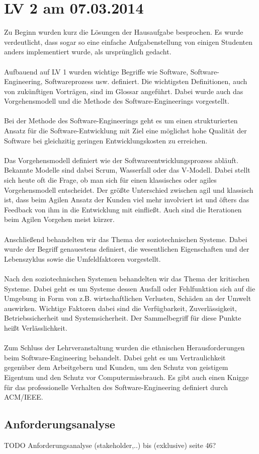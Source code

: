 \chapter{LV 2 am 07.03.2014}
Zu Beginn wurden kurz die Lösungen der Hausaufgabe besprochen. Es wurde verdeutlicht, dass sogar so eine einfache Aufgabenstellung von einigen Studenten anders implementiert wurde, als ursprünglich gedacht.
\\\\
Aufbauend auf LV 1 wurden wichtige Begriffe wie Software, Software-Engineering, Softwareprozess usw. definiert. Die wichtigsten Definitionen, auch von zukünftigen Vorträgen, sind im Glossar angeführt. Dabei wurde auch das Vorgehensmodell und die Methode des Software-Engineerings vorgestellt.
\\\\
Bei der Methode des Software-Engineerings geht es um einen strukturierten Ansatz für die Software-Entwicklung mit Ziel eine möglichst hohe Qualität der Software bei gleichzitig geringen Entwicklungskosten zu erreichen.
\\\\
Das Vorgehensmodell definiert wie der Softwareentwicklungsprozess abläuft. Bekannte Modelle sind dabei Scrum, Wasserfall oder das V-Modell. Dabei stellt sich heute oft die Frage, ob man sich für einen klassisches oder agiles Vorgehensmodell entscheidet. Der größte Unterschied zwischen agil und klassisch ist, dass beim Agilen Ansatz der Kunden viel mehr involviert ist und öfters das Feedback von ihm in die Entwicklung mit einfließt. Auch sind die Iterationen beim Agilen Vorgehen meist kürzer.
\\\\
Anschließend behandelten wir das Thema der soziotechnischen Systeme. Dabei wurde der Begriff genauestens definiert, die wesentlichen Eigenschaften und der Lebenszyklus sowie die Umfeldfaktoren vorgestellt.
\\\\
Nach den soziotechnischen Systemen behandelten wir das Thema der kritischen Systeme. Dabei geht es um Systeme dessen Ausfall oder Fehlfunktion sich auf die Umgebung in Form von z.B. wirtschaftlichen Verlusten, Schäden an der Umwelt  auswirken. Wichtige Faktoren dabei sind die Verfügbarkeit, Zuverlässigkeit, Betriebssicherheit und Systemsicherheit. Der Sammelbegriff für diese Punkte heißt Verlässlichkeit.
\\\\
Zum Schluss der Lehrveranstaltung wurden die ethnischen Herausforderungen beim Software-Engineering behandelt. Dabei geht es um Vertraulichkeit gegenüber dem Arbeitgebern und Kunden, um den Schutz von geistigem Eigentum und den Schutz vor Computermissbrauch. Es gibt auch einen Knigge für das professionelle Verhalten des Software-Engineering definiert durch ACM/IEEE.

\section{Anforderungsanalyse}
TODO Anforderungsanalyse (stakeholder,..) bis (exklusive) seite 46?